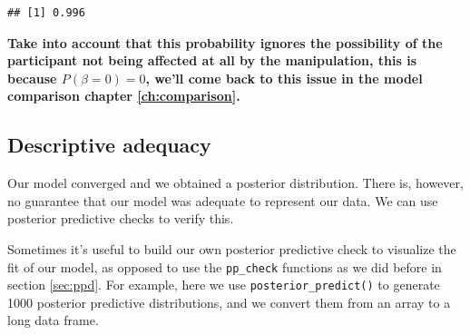 \documentclass[12pt,]{krantz}
\newenvironment{Shaded}{\begin{snugshade}}{\end{snugshade}}
\newcommand{\KeywordTok}[1]{\textcolor[rgb]{0.13,0.29,0.53}{\textbf{#1}}}
\newcommand{\DataTypeTok}[1]{\textcolor[rgb]{0.13,0.29,0.53}{#1}}
\newcommand{\DecValTok}[1]{\textcolor[rgb]{0.00,0.00,0.81}{#1}}
\newcommand{\StringTok}[1]{\textcolor[rgb]{0.31,0.60,0.02}{#1}}
\newcommand{\CommentTok}[1]{\textcolor[rgb]{0.56,0.35,0.01}{\textit{#1}}}
\newcommand{\ControlFlowTok}[1]{\textcolor[rgb]{0.13,0.29,0.53}{\textbf{#1}}}
\newcommand{\OperatorTok}[1]{\textcolor[rgb]{0.81,0.36,0.00}{\textbf{#1}}}
\newcommand{\NormalTok}[1]{#1}
\theoremstyle{definition}
\theoremstyle{definition}
\theoremstyle{definition}
\theoremstyle{remark}
\begin{document}
\begin{verbatim}
## [1] 0.996
\end{verbatim}

\textbf{Take into account that this probability ignores the possibility
of the participant not being affected at all by the manipulation, this
is because \(P(\beta=0)=0\), we'll come back to this issue in the model
comparison chapter \ref{ch:comparison}.}

\subsection{Descriptive adequacy}\label{sec:pupiladq}

Our model converged and we obtained a posterior distribution. There is,
however, no guarantee that our model was adequate to represent our data.
We can use posterior predictive checks to verify this.

Sometimes it's useful to build our own posterior predictive check to
visualize the fit of our model, as opposed to use the \texttt{pp\_check}
functions as we did before in section \ref{sec:ppd}. For example, here
we use \texttt{posterior\_predict()} to generate 1000 posterior
predictive distributions, and we convert them from an array to a long
data frame.

\begin{Shaded}
\end{Shaded}
\end{document}
